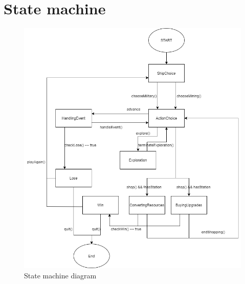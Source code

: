 \documentclass[a4paper,12pt]{article}
\begin{document}
\section{State machine}
\begin{figure}[H]
	\caption{State machine diagram}
	\includegraphics[scale=0.5]{StateDiagram.png}
\end{figure}

\newpage
\end{document}

